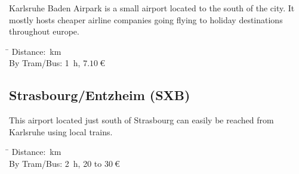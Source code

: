\begin{multicols}{2}
Karlsruhe Baden Airpark is a small airport located to the south of the city. It
mostly hosts cheaper airline companies going flying to holiday destinations
throughout europe.

\begin{tabbing}
\hspace*{2.5cm} \= \kill
Distance: \,km \\
By Tram/Bus: \> \SI{1}{\hour}, $\SI{7.10}{\euro}$ \\
\end{tabbing}

\subsection{Strasbourg/Entzheim (SXB)}

This airport located just south of Strasbourg can easily be reached from Karlsruhe
using local trains.

\begin{tabbing}
\hspace*{2.5cm} \= \kill
Distance: \,km \\
By Tram/Bus: \> \SI{2}{\hour}, 20 to $\SI{30}{\euro}$ \\
\end{tabbing}

\end{multicols}

